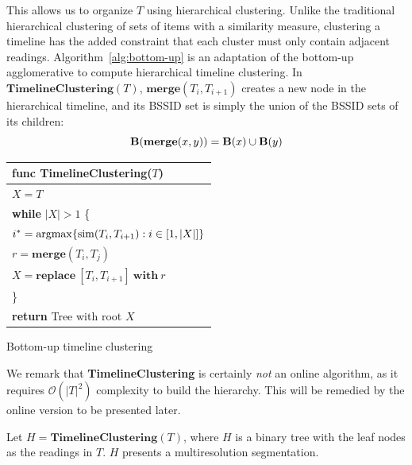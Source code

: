 This allows us to organize $T$ using hierarchical clustering.
Unlike the traditional hierarchical clustering of sets of items with a
similarity measure, clustering a timeline has the added constraint that each
cluster must only contain adjacent readings.
Algorithm~\ref{alg:bottom-up} is an
adaptation of the bottom-up agglomerative to compute hierarchical timeline
clustering.  In $\mathbf{TimelineClustering}(T)$, 
$\mathbf{merge}(T_i, T_{i+1})$ creates a new node in the hierarchical timeline,
and its BSSID set is simply the union of the BSSID sets of its children:
$$\mathbf{B}(\mathbf{merge}(x, y)) = \mathbf{B}(x)\cup\mathbf{B}(y)$$ 

\begin{algorithm}[t]
    \centering
\begin{tabular}{|l|}\hline
    func {\bf TimelineClustering}($T$) \\\hline
    $X = T$ \\
    {\bf while} $|X| > 1$ \{ \\
        \RRR $i^* = \mathrm{argmax}\{\mathrm{sim}(T_i,T_{i+1}) : i\in [1, |X|]\}$ \\
        \RRR $r = \mathbf{merge}(T_i, T_j)$ \\
        \RRR $X = \mathbf{replace}\ [T_i, T_{i+1}]\ \mathbf{with}\ r$\\
    \}\\ 
    {\bf return} Tree with root $X$\\ \hline
\end{tabular}
\vspace{0.5cm}
\caption{Bottom-up timeline clustering}
\label{alg:bottom-up}
\end{algorithm}

We remark that {\bf TimelineClustering} is certainly {\em not} an online
algorithm, as it requires $\mathcal{O}(|T|^2)$ complexity to build the
hierarchy.  This will be remedied by the online version to be presented
later.

Let $H = \mathbf{TimelineClustering}(T)$, where $H$ is a binary tree with the
leaf nodes as the readings in $T$.
$H$ presents a multiresolution segmentation.

